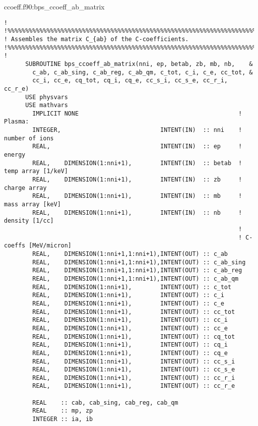 \documentclass[preprint,12pt,eqsecnum,nofootinbib,amsmath,amssymb]{revtex4}
\begin{document}
\vskip0.4cm 
\noindent
ccoeff.f90:bps\_ccoeff\_ab\_matrix
{
\baselineskip 10pt
\begin{verbatim}
!
!%%%%%%%%%%%%%%%%%%%%%%%%%%%%%%%%%%%%%%%%%%%%%%%%%%%%%%%%%%%%%%%%%%%%%%%%%%%%
! Assembles the matrix C_{ab} of the C-coefficients.
!%%%%%%%%%%%%%%%%%%%%%%%%%%%%%%%%%%%%%%%%%%%%%%%%%%%%%%%%%%%%%%%%%%%%%%%%%%%%
!
      SUBROUTINE bps_ccoeff_ab_matrix(nni, ep, betab, zb, mb, nb,    &
        c_ab, c_ab_sing, c_ab_reg, c_ab_qm, c_tot, c_i, c_e, cc_tot, &
        cc_i, cc_e, cq_tot, cq_i, cq_e, cc_s_i, cc_s_e, cc_r_i, cc_r_e)
      USE physvars
      USE mathvars    
        IMPLICIT NONE                                             ! Plasma:
        INTEGER,                            INTENT(IN)  :: nni    !  number of ions
        REAL,                               INTENT(IN)  :: ep     !  energy
        REAL,    DIMENSION(1:nni+1),        INTENT(IN)  :: betab  !  temp array [1/keV]
        REAL,    DIMENSION(1:nni+1),        INTENT(IN)  :: zb     !  charge array
        REAL,    DIMENSION(1:nni+1),        INTENT(IN)  :: mb     !  mass array [keV]
        REAL,    DIMENSION(1:nni+1),        INTENT(IN)  :: nb     !  density [1/cc]
                                                                  !
                                                                  ! C-coeffs [MeV/micron]
        REAL,    DIMENSION(1:nni+1,1:nni+1),INTENT(OUT) :: c_ab
        REAL,    DIMENSION(1:nni+1,1:nni+1),INTENT(OUT) :: c_ab_sing
        REAL,    DIMENSION(1:nni+1,1:nni+1),INTENT(OUT) :: c_ab_reg
        REAL,    DIMENSION(1:nni+1,1:nni+1),INTENT(OUT) :: c_ab_qm
        REAL,    DIMENSION(1:nni+1),        INTENT(OUT) :: c_tot
        REAL,    DIMENSION(1:nni+1),        INTENT(OUT) :: c_i
        REAL,    DIMENSION(1:nni+1),        INTENT(OUT) :: c_e
        REAL,    DIMENSION(1:nni+1),        INTENT(OUT) :: cc_tot
        REAL,    DIMENSION(1:nni+1),        INTENT(OUT) :: cc_i
        REAL,    DIMENSION(1:nni+1),        INTENT(OUT) :: cc_e
        REAL,    DIMENSION(1:nni+1),        INTENT(OUT) :: cq_tot
        REAL,    DIMENSION(1:nni+1),        INTENT(OUT) :: cq_i
        REAL,    DIMENSION(1:nni+1),        INTENT(OUT) :: cq_e
        REAL,    DIMENSION(1:nni+1),        INTENT(OUT) :: cc_s_i
        REAL,    DIMENSION(1:nni+1),        INTENT(OUT) :: cc_s_e
        REAL,    DIMENSION(1:nni+1),        INTENT(OUT) :: cc_r_i
        REAL,    DIMENSION(1:nni+1),        INTENT(OUT) :: cc_r_e

        REAL    :: cab, cab_sing, cab_reg, cab_qm
        REAL    :: mp, zp
        INTEGER :: ia, ib


\end{verbatim}}
\end{document}
